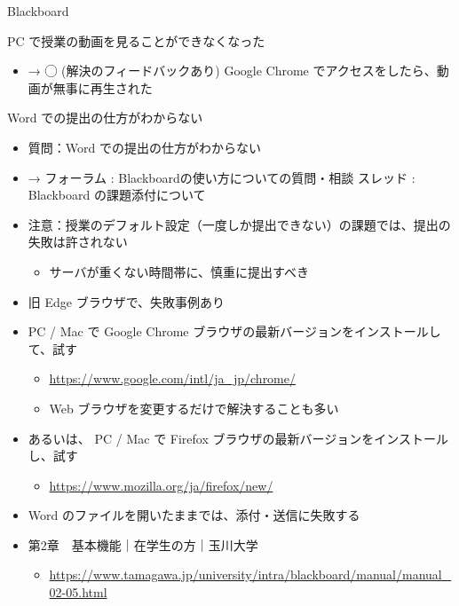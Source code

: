 \documentclass[a4j,10pt]{jsarticle}
\begin{document}
{\begin{frame}[label={sec:orgc119bb0},fragile]{Blackboard}
\begin{block}{PC で授業の動画を見ることができなくなった}
\begin{itemize}
\begin{itemize}
\par
\item → ◯ (解決のフィードバックあり) Google Chrome でアクセスをしたら、動画が無事に再生された
\end{itemize}
\end{itemize}
\end{block}
\par
\begin{block}{Word での提出の仕方がわからない}
\begin{itemize}
\item 質問：Word での提出の仕方がわからない
\par
\item → フォーラム : Blackboardの使い方についての質問・相談 スレッド : Blackboard の課題添付について
\par
\item 注意：授業のデフォルト設定（一度しか提出できない）の課題では、提出の失敗は許されない
\begin{itemize}
\item サーバが重くない時間帯に、慎重に提出すべき
\end{itemize}
\par
\item 旧 Edge ブラウザで、失敗事例あり
\par
\item PC / Mac で Google Chrome ブラウザの最新バージョンをインストールして、試す
\begin{itemize}
\item \url{https://www.google.com/intl/ja\_jp/chrome/}
\item Web ブラウザを変更するだけで解決することも多い
\end{itemize}
\par
\item あるいは、 PC / Mac で Firefox ブラウザの最新バージョンをインストールし、試す
\begin{itemize}
\item \url{https://www.mozilla.org/ja/firefox/new/}
\end{itemize}
\par
\item Word のファイルを開いたままでは、添付・送信に失敗する
\par
\item 第2章　基本機能｜在学生の方｜玉川大学
\begin{itemize}
\item \url{https://www.tamagawa.jp/university/intra/blackboard/manual/manual\_02-05.html}
\end{itemize}

\end{itemize}
\end{block}
\end{frame}}
\end{document}
